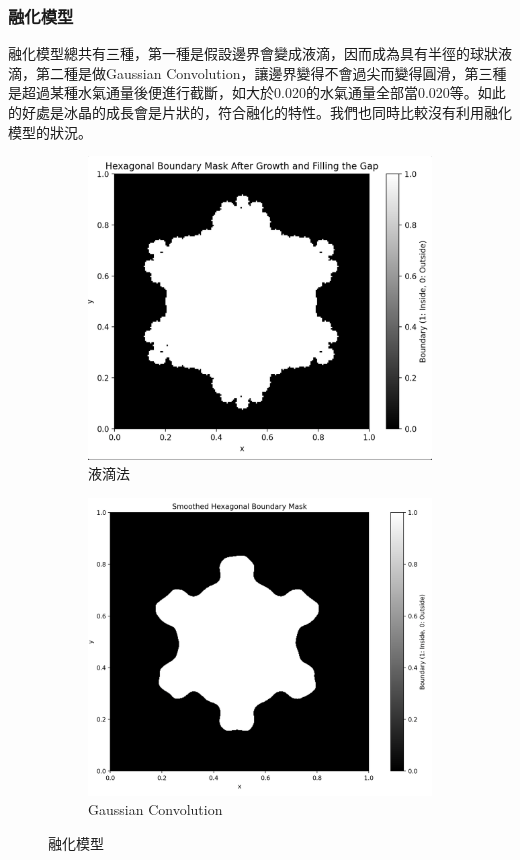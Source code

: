 \documentclass[12pt, a4paper]{article}
\theoremstyle{mystyle}	%
\begin{document}
\subsubsection{融化模型}
融化模型總共有三種，第一種是假設邊界會變成液滴，因而成為具有半徑的球狀液滴，第二種是做Gaussian Convolution，讓邊界變得不會過尖而變得圓滑，第三種是超過某種水氣通量後便進行截斷，如大於0.020的水氣通量全部當0.020等。如此的好處是冰晶的成長會是片狀的，符合融化的特性。我們也同時比較沒有利用融化模型的狀況。
\begin{figure}[H]
\centering
\begin{subfigure}{.5\textwidth}
    \centering
    \includegraphics[height=.8\linewidth]{sphere.png}
    \caption{液滴法}
    \label{pot}
\end{subfigure}%
\begin{subfigure}{.5\textwidth}
    \centering
    \includegraphics[height=.8\linewidth]{gaussian.png}
    \caption{Gaussian Convolution}
    \label{grad}
    \end{subfigure}
    \caption{融化模型}
    \label{pog}
\end{figure}
\end{document}
